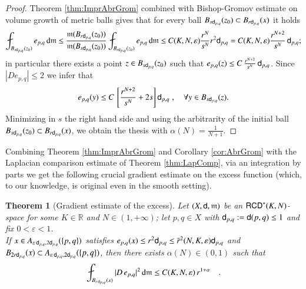 \documentclass[11pt,reqno]{amsart}
\newcommand{\mm}{\mathfrak m}
\newcommand{\sfd}{{\sf d}}
\renewcommand{\d}{{\rm{d}}}
\newcommand{\R}{\mathbb{R}}
\newcommand{\RCD}{{\sf RCD}}
\newtheorem{theorem}{Theorem}[section]
\theoremstyle{definition}
\theoremstyle{remark}
\theoremstyle{remark}
\theoremstyle{remark}
\theoremstyle{remark}
\theoremstyle{remark}
\theoremstyle{remark}
\theoremstyle{remark}
\begin{document}
\begin{proof}
Theorem \ref{thm:ImprAbrGrom} combined with Bishop-Gromov  estimate on volume growth of metric balls \cite{BS2010,CS12,CM16} gives that
for every ball $B_{s \sfd_{p,q}}(z_0)\subset B_{r\sfd_{p,q}}(x)$ it holds
$$\fint_{B_{s \sfd_{p,q}}(z_0)}  e_{p,q} \, \d \mm \leq \frac{\mm(B_{r \sfd_{p,q}}(z_0))}{\mm(B_{s \sfd_{p,q}}(z_0))} \fint_{B_{r \sfd_{p,q}}(z_0)}  e_{p,q} \, \d \mm \leq C(K,N,\varepsilon) \frac{r^{N}}{s^{N}} r^2 \sfd_{p,q}=  C(K,N,\varepsilon) \frac{r^{N+2}}{s^{N}} \, \sfd_{p,q};$$
in particular there exists a point $z \in B_{s \sfd_{p,q}}(z_0)$ such that $e_{p,q}(z)\leq  C \, \frac{r^{N+2}}{s^{N}} \, \sfd_{p,q}$. Since $|D e_{p,q}|\leq 2$ we infer that 
$$e_{p,q}(y) \leq   C \, \left[ \frac{r^{N+2}}{s^{N}}+ 2 s \right]  \sfd_{p,q} \;, \quad \forall y \in B_{s \sfd_{p,q}}(z).$$
Minimizing in $s$ the right hand side and using the arbitrarity of the initial ball $B_{s \sfd_{p,q}}(z_0)\subset B_{r\sfd_{p,q}}(x)$,   we obtain the thesis with $\alpha(N)=\frac{1}{N+1}$.   
\end{proof}
\noindent
Combining   Theorem \ref{thm:ImprAbrGrom}  and Corollary \ref{cor:AbrGrom} with the Laplacian comparison estimate of Theorem \ref{thm:LapComp}, via an integration by parts we get the following crucial gradient estimate on the excess function (which, to our knowledge, is original even in the smooth setting).

\begin{theorem}[Gradient estimate of the excess]\label{thm:GradExc}
Let $(X,\sfd,\mm)$ be an  $\RCD^*(K,N)$-space for some $K \in \R$ and $N \in (1,+\infty)$; let $p,q \in X$ with $\sfd_{p,q}:=\sfd(p,q)\leq 1$ and  fix $0<\varepsilon<1$. \\ If $x \in A_{\varepsilon \, \sfd_{p,q}, 2 \sfd_{p,q}}(\{p,q\})$ satisfies $e_{p,q}(x)\leq r^2 \sfd_{p,q} \leq \bar{r}^2(N,K,\varepsilon) \sfd_{p,q}$ and $B_{2r \sfd_{p,q}}(x)\subset  A_{\varepsilon \, \sfd_{p,q}, 2 \sfd_{p,q}}(\{p,q\})$, then there exists $\alpha(N)\in (0,1)$ such that
$$\fint_{B_{r\, \sfd_{p,q}}(x)} |D \,e_{p,q}|^2\, \d \mm \leq C(K,N,\varepsilon) \, r^{1+\alpha}  \quad.$$
\end{theorem}
\end{document}
